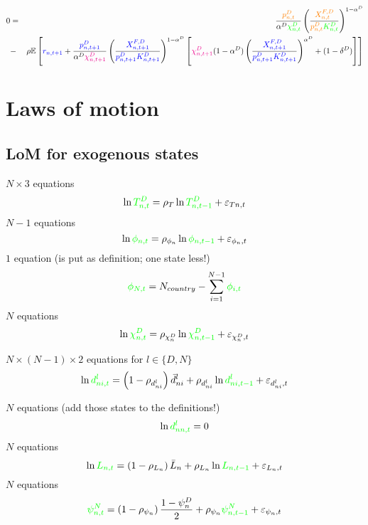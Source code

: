 \documentclass[12pt, bibtotoc, tablecaptionabove, figurecaptionabove, fleqn]{article}
\newcommand{\cl}[1]{{\color{orange}{#1}}}
\newcommand{\st}[1]{{\color{green}{#1}}}
\newcommand{\stnext}[1]{{\color{magenta}{#1}}}
\newcommand{\clnext}[1]{{\color{blue}{#1}}}
\begin{document}
\begin{eqnarray}
	0 &=& \frac{\cl{p_{n, t}^{D}}}{\alpha^D \st{\chi^D_{n, t}}}\left(\frac{\cl{X_{n, t}^{F,D}}}{\cl{p_{n, t}^{D}} \st{K^D_{n, t}}}\right)^{1-\alpha^D} \\
	&-& \rho \mathbb{E}\left[\clnext{r_{n, t+1}} + \frac{\clnext{p_{n, t+1}^{D}}}{\alpha^D \stnext{\chi^D_{n, t+1}}}\left(\frac{\clnext{X_{n, t+1}^{F,D}}}{\clnext{p_{n, t+1}^{D}} \clnext{K^D_{n, t+1}}}\right)^{1-\alpha^D}\left[\stnext{\chi^D_{n, t+1}}(1-\alpha^D)\left(\frac{\clnext{X_{n, t+1}^{F,D}}}{\clnext{p_{n, t+1}^{D}} \clnext{K^D_{n, t+1}}}\right)^{\alpha^D}+(1-\delta^D)\right]\right]\nonumber 
\end{eqnarray}



\section{Laws of motion}

\subsection{LoM for exogenous states}

\noindent $N \times 3$ equations
\begin{equation}
\ln \st{T^D_{n,t}} = \rho_T \ln  \st{T^D_{n,t-1}} + \varepsilon_{Tn,t}    
\end{equation}
\noindent $N-1$ equations
\begin{equation}
\ln \st{\phi_{n,t}} = \rho_{\phi_n} \ln  \st{\phi_{n,t-1}} + \varepsilon_{\phi_n,t}  
\end{equation}
\noindent $1$ equation (is put as definition; one state less!)
\begin{equation}
\st{\phi_{N,t}} = N_{country} - \sum_{i=1}^{N-1} \st{\phi_{i,t}}
\end{equation}
\noindent $N$ equations
\begin{equation}
\ln \st{\chi^D_{n,t}} = \rho_{\chi^D_n} \ln  \st{\chi^D_{n,t-1}} + \varepsilon_{\chi^D_n,t}    
\end{equation}

\noindent $N \times (N-1) \times 2$ equations for $l \in \{D,N\}$
\begin{equation}
\ln \st{d^l_{ni,t}} = \left(1 - \rho_{d^l_{ni}} \right) \bar{d}^l_{ni} + \rho_{d^l_{ni}} \ln  \st{d^l_{ni,t-1}} + \varepsilon_{d^l_{ni},t}    
\end{equation}

\noindent $N$ equations (add those states to the definitions!)
\begin{equation}
\ln \st{d^l_{nn,t}} = 0  
\end{equation}
\noindent $N$ equations
\begin{equation}
\ln \st{L_{n,t}} = \left(1 - \rho_{L_{n}} \right) \bar{L}_{n} + \rho_{L_{n}} \ln  \st{L_{n,t-1}} + \varepsilon_{L_{n},t}    
\end{equation}
\noindent $N$ equations
\begin{equation}
	\st{\psi_{n,t}^N} =  \left(1 - \rho_{\psi_{n}} \right) \frac{1 - \psi^D_{n}}{2} + \rho_{\psi_{n}} \st{\psi_{n,t-1}^N} + \varepsilon_{\psi_{n},t}   
\end{equation}
\end{document}
